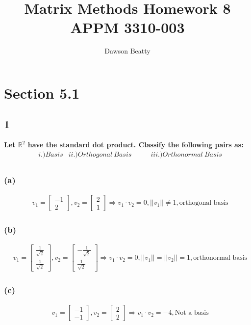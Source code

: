\documentclass[10pt,letterpaper]{article}
\title{Matrix Methods Homework 8 \\ APPM 3310-003}
\author{Dawson Beatty}
\begin{document}
	\maketitle
	\section*{Section 5.1} 
	\subsection*{1}\textbf{Let $\mathbb{R}^2$ have the standard dot product. Classify the following pairs as: }
	\begin{align*}
	& i.) Basis & ii.) Orthogonal \: Basis & \qquad iii.) Orthonormal \: Basis \\
	\end{align*}
	\subsubsection*{(a)} 
	\begin{align*}
	& v_1 = \begin{bmatrix}
	-1 \\ 2
	\end{bmatrix}, v_2 = \begin{bmatrix}
	2 \\ 1 
	\end{bmatrix} \Rightarrow v_1 \cdot v_2 = 0, ||v_1|| \neq 1, \boxed{\text{orthogonal basis}}
	\end{align*}
	\subsubsection*{(b)}
	\begin{align*}
	& v_1 = \begin{bmatrix}
	\frac{1}{\sqrt{2}} \\ \frac{1}{\sqrt{2}}
	\end{bmatrix}, v_2 = \begin{bmatrix}
	- \frac{1}{\sqrt{2}} \\ \frac{1}{\sqrt{2}} 
	\end{bmatrix} \Rightarrow v_1 \cdot v_2 = 0, ||v_1|| = ||v_2|| = 1, \boxed{\text{orthonormal basis}}
	\end{align*}
	\subsubsection*{(c)}
		\begin{align*}
		& v_1 = \begin{bmatrix}
		-1 \\ -1
		\end{bmatrix}, v_2 = \begin{bmatrix}
		2 \\ 2 
		\end{bmatrix} \Rightarrow v_1 \cdot v_2 = -4, \boxed{\text{Not a basis}}
		\end{align*}
\end{document}
